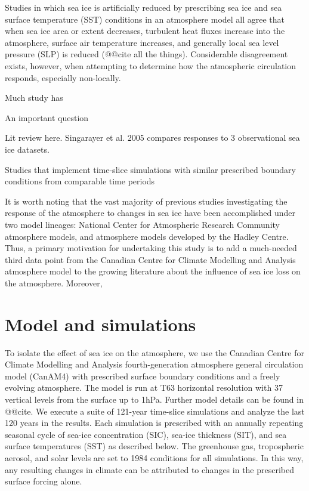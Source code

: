 \documentclass[twocol]{ametsoc}
\begin{document}
Studies in which sea ice is artificially reduced by prescribing sea ice and sea surface temperature (SST) conditions in an atmosphere model all agree that when sea ice area or extent decreases, turbulent heat fluxes increase into the atmosphere, surface air temperature increases, and generally local sea level pressure (SLP) is reduced (@@cite all the things). Considerable disagreement exists, however, when attempting to determine how the atmospheric circulation responds, especially non-locally. 

Much study has 

An important question

Lit review here. Singarayer et al. 2005 compares responses to 3 observational sea ice datasets.

Studies that implement time-slice simulations with similar prescribed boundary conditions from comparable time periods 

It is worth noting that the vast majority of previous studies investigating the response of the atmosphere to changes in sea ice have been accomplished under two model lineages: National Center for Atmospheric Research Community atmosphere models, and atmosphere models developed by the Hadley Centre. Thus, a primary motivation for undertaking this study is to add a much-needed third data point from the Canadian Centre for Climate Modelling and Analysis atmosphere model to the growing literature about the influence of sea ice loss on the atmosphere. Moreover, 

\section{Model and simulations}

To isolate the effect of sea ice on the atmosphere, we use the Canadian Centre for Climate Modelling and Analysis fourth-generation atmosphere general circulation model (CanAM4) with prescribed surface boundary conditions and a freely evolving atmosphere. The model is run at T63 horizontal resolution with 37 vertical levels from the surface up to 1hPa. Further model details can be found in @@cite. We execute a suite of 121-year time-slice simulations and analyze the last 120 years in the results. Each simulation is prescribed with an annually repeating seasonal cycle of sea-ice concentration (SIC), sea-ice thickness (SIT), and sea surface temperatures (SST) as described below. The greenhouse gas, tropospheric aerosol, and solar levels are set to 1984 conditions for all simulations. In this way, any resulting changes in climate can be attributed to changes in the prescribed surface forcing alone.
\end{document}
